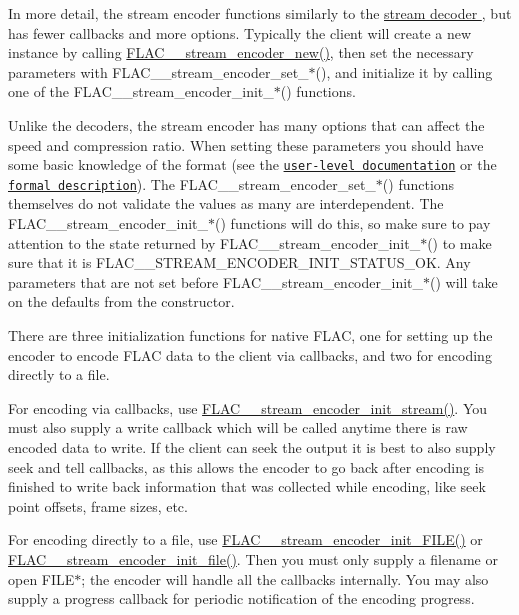 In more detail, the stream encoder functions similarly to the \hyperlink{group__flac__stream__decoder}{stream decoder }, but has fewer callbacks and more options. Typically the client will create a new instance by calling \hyperlink{group__flac__stream__encoder_ga35f3d94452bcf0a90a31c7d770b200bc}{F\+L\+A\+C\+\_\+\+\_\+stream\+\_\+encoder\+\_\+new()}, then set the necessary parameters with F\+L\+A\+C\+\_\+\+\_\+stream\+\_\+encoder\+\_\+set\+\_\+$\ast$(), and initialize it by calling one of the F\+L\+A\+C\+\_\+\+\_\+stream\+\_\+encoder\+\_\+init\+\_\+$\ast$() functions.

Unlike the decoders, the stream encoder has many options that can affect the speed and compression ratio. When setting these parameters you should have some basic knowledge of the format (see the \href{../documentation_format_overview.html}{\tt user-\/level documentation} or the \href{../format.html}{\tt formal description}). The F\+L\+A\+C\+\_\+\+\_\+stream\+\_\+encoder\+\_\+set\+\_\+$\ast$() functions themselves do not validate the values as many are interdependent. The F\+L\+A\+C\+\_\+\+\_\+stream\+\_\+encoder\+\_\+init\+\_\+$\ast$() functions will do this, so make sure to pay attention to the state returned by F\+L\+A\+C\+\_\+\+\_\+stream\+\_\+encoder\+\_\+init\+\_\+$\ast$() to make sure that it is F\+L\+A\+C\+\_\+\+\_\+\+S\+T\+R\+E\+A\+M\+\_\+\+E\+N\+C\+O\+D\+E\+R\+\_\+\+I\+N\+I\+T\+\_\+\+S\+T\+A\+T\+U\+S\+\_\+\+OK. Any parameters that are not set before F\+L\+A\+C\+\_\+\+\_\+stream\+\_\+encoder\+\_\+init\+\_\+$\ast$() will take on the defaults from the constructor.

There are three initialization functions for native F\+L\+AC, one for setting up the encoder to encode F\+L\+AC data to the client via callbacks, and two for encoding directly to a file.

For encoding via callbacks, use \hyperlink{group__flac__stream__encoder_ga85221c4ceb9f22dfd4983d8f07a9a35b}{F\+L\+A\+C\+\_\+\+\_\+stream\+\_\+encoder\+\_\+init\+\_\+stream()}. You must also supply a write callback which will be called anytime there is raw encoded data to write. If the client can seek the output it is best to also supply seek and tell callbacks, as this allows the encoder to go back after encoding is finished to write back information that was collected while encoding, like seek point offsets, frame sizes, etc.

For encoding directly to a file, use \hyperlink{group__flac__stream__encoder_ga78653fea5d9bc490fff34e3ef86de944}{F\+L\+A\+C\+\_\+\+\_\+stream\+\_\+encoder\+\_\+init\+\_\+\+F\+I\+L\+E()} or \hyperlink{group__flac__stream__encoder_ga693bb5ed30d912822e0e6c7c0404428c}{F\+L\+A\+C\+\_\+\+\_\+stream\+\_\+encoder\+\_\+init\+\_\+file()}. Then you must only supply a filename or open {\ttfamily F\+I\+L\+E$\ast$}; the encoder will handle all the callbacks internally. You may also supply a progress callback for periodic notification of the encoding progress.

